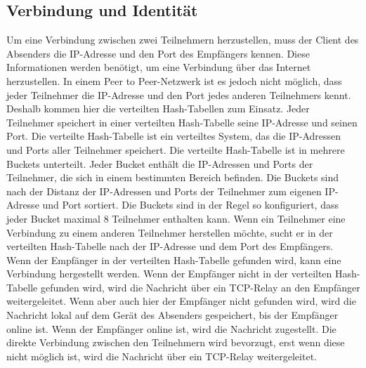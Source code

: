 \subsection{Verbindung und Identität}

Um eine Verbindung zwischen zwei Teilnehmern herzustellen, muss der Client des
Absenders die IP-Adresse und den Port des Empfängers kennen. Diese Informationen
werden benötigt, um eine Verbindung über das Internet herzustellen. In einem Peer
to Peer-Netzwerk ist es jedoch nicht möglich, dass jeder Teilnehmer die IP-Adresse
und den Port jedes anderen Teilnehmers kennt. Deshalb kommen hier die verteilten
Hash-Tabellen zum Einsatz. Jeder Teilnehmer speichert in einer verteilten Hash-Tabelle
seine IP-Adresse und seinen Port. Die verteilte Hash-Tabelle ist ein verteiltes
System, das die IP-Adressen und Ports aller Teilnehmer speichert. Die verteilte
Hash-Tabelle ist in mehrere Buckets unterteilt. Jeder Bucket enthält die IP-Adressen
und Ports der Teilnehmer, die sich in einem bestimmten Bereich befinden. Die
Buckets sind nach der Distanz der IP-Adressen und Ports der Teilnehmer zum eigenen
IP-Adresse und Port sortiert. Die Buckets sind in der Regel so konfiguriert, dass
jeder Bucket maximal 8 Teilnehmer enthalten kann. Wenn ein Teilnehmer eine Verbindung
zu einem anderen Teilnehmer herstellen möchte, sucht er in der verteilten Hash-Tabelle
nach der IP-Adresse und dem Port des Empfängers. Wenn der Empfänger in der verteilten
Hash-Tabelle gefunden wird, kann eine Verbindung hergestellt werden. Wenn der Empfänger
nicht in der verteilten Hash-Tabelle gefunden wird, wird die Nachricht über ein
TCP-Relay an den Empfänger weitergeleitet. Wenn aber auch hier der Empfänger nicht
gefunden wird, wird die Nachricht lokal auf dem Gerät des Absenders gespeichert,
bis der Empfänger online ist. Wenn der Empfänger online ist, wird die Nachricht
zugestellt. Die direkte Verbindung zwischen den Teilnehmern wird bevorzugt, erst wenn
diese nicht möglich ist, wird die Nachricht über ein TCP-Relay weitergeleitet.